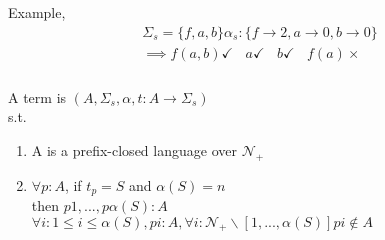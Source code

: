 \documentclass{article}
\begin{document}
Example,\\
\begin{gather}
    \Sigma_{s} = \{f,a,b\}
    \alpha_{s}: \{f\xrightarrow{}2, a\xrightarrow{}0, b\xrightarrow{}0\}\\
    \implies f(a,b) \checkmark \ \ \ \ a \checkmark \ \ \ \ b \checkmark \ \ \ \ f(a) \times
\end{gather}

\subsubsection{}
A term is $(A,\Sigma_{s}, \alpha, t: A\xrightarrow{} \Sigma_{s})$\\
s.t.
\begin{enumerate}
    \item A is a prefix-closed language over $\mathcal{N}_{+}$
    \item $\forall p: A$, if $t_{p}=S$ and $\alpha(S)=n$\\
    then $p1,..., p\alpha(S): A$ \ \ \ \ \  \ \ \ 
    $\forall i: 1 \leq i \leq \alpha(S), pi: A, \forall i: \mathcal{N}_{+}\backslash[1,...,\alpha(S)]pi\notin A$
\end{enumerate}
\newpage
\end{document}
